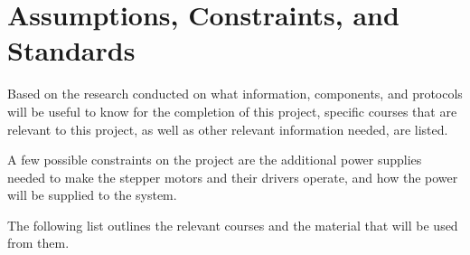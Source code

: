 \section{Assumptions, Constraints, and Standards}
Based on the research conducted on what information, components, and protocols will be useful to know for the completion of this project, specific courses that are relevant to this project, as well as other relevant information needed, are listed.\par

A few possible constraints on the project are the additional power supplies needed to make the stepper motors and their drivers operate, and how the power will be supplied to the system.\par 
The following list outlines the relevant courses and the material that will be used from them.\\\par


